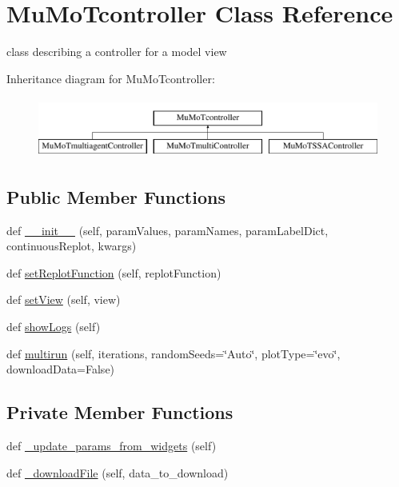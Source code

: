 \hypertarget{class_mu_mo_t_1_1_mu_mo_tcontroller}{}\section{Mu\+Mo\+Tcontroller Class Reference}
\label{class_mu_mo_t_1_1_mu_mo_tcontroller}


class describing a controller for a model view  


Inheritance diagram for Mu\+Mo\+Tcontroller\+:\begin{figure}[H]
\begin{center}
\leavevmode
\includegraphics[height=2.000000cm]{class_mu_mo_t_1_1_mu_mo_tcontroller}
\end{center}
\end{figure}
\subsection*{Public Member Functions}
\begin{DoxyCompactItemize}
\item 
def \hyperlink{class_mu_mo_t_1_1_mu_mo_tcontroller_a833cd489e067743a190b434eea451095}{\+\_\+\+\_\+init\+\_\+\+\_\+} (self, param\+Values, param\+Names, param\+Label\+Dict, continuous\+Replot, kwargs)
\item 
def \hyperlink{class_mu_mo_t_1_1_mu_mo_tcontroller_aafc1e69cab41071217fe6676a8089249}{set\+Replot\+Function} (self, replot\+Function)
\item 
def \hyperlink{class_mu_mo_t_1_1_mu_mo_tcontroller_a40e22e664ecb6e379377ee1cea60073c}{set\+View} (self, view)
\item 
def \hyperlink{class_mu_mo_t_1_1_mu_mo_tcontroller_aca4d648d909f4722c7e07197675500bb}{show\+Logs} (self)
\item 
def \hyperlink{class_mu_mo_t_1_1_mu_mo_tcontroller_aa74bfc216071ff6b768c7a584917bfc6}{multirun} (self, iterations, random\+Seeds=\char`\"{}Auto\char`\"{}, plot\+Type=\char`\"{}evo\char`\"{}, download\+Data=False)
\end{DoxyCompactItemize}
\subsection*{Private Member Functions}
\begin{DoxyCompactItemize}
\item 
def \hyperlink{class_mu_mo_t_1_1_mu_mo_tcontroller_add4eacb8e812feeca1d4b2538e3bd6e0}{\+\_\+update\+\_\+params\+\_\+from\+\_\+widgets} (self)
\item 
def \hyperlink{class_mu_mo_t_1_1_mu_mo_tcontroller_ab703aa8fe14c83d5f12fa82d4e2c42d9}{\+\_\+download\+File} (self, data\+\_\+to\+\_\+download)
\end{DoxyCompactItemize}

